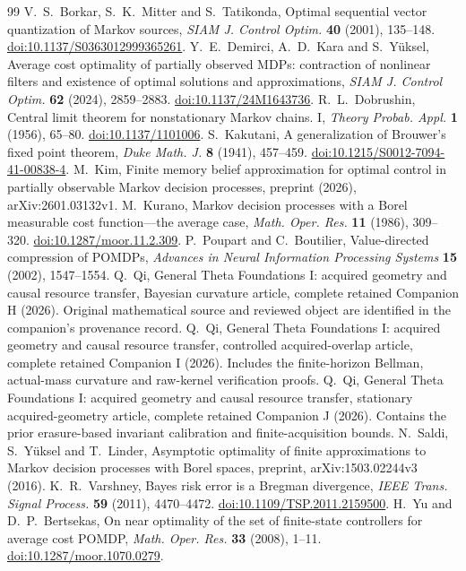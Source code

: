 \enlargethispage{2\baselineskip}
\begin{thebibliography}{99}
 V.~S.~Borkar, S.~K.~Mitter and S.~Tatikonda, Optimal sequential vector quantization of Markov sources, \emph{SIAM J. Control Optim.} \textbf{40} (2001), 135--148. \href{https://doi.org/10.1137/S0363012999365261}{doi:10.1137/S0363012999365261}.
 Y.~E.~Demirci, A.~D.~Kara and S.~Y\"uksel, Average cost optimality of partially observed MDPs: contraction of nonlinear filters and existence of optimal solutions and approximations, \emph{SIAM J. Control Optim.} \textbf{62} (2024), 2859--2883. \href{https://doi.org/10.1137/24M1643736}{doi:10.1137/24M1643736}.
 R.~L.~Dobrushin, Central limit theorem for nonstationary Markov chains. I, \emph{Theory Probab. Appl.} \textbf{1} (1956), 65--80. \href{https://doi.org/10.1137/1101006}{doi:10.1137/1101006}.
 S.~Kakutani, A generalization of Brouwer's fixed point theorem, \emph{Duke Math. J.} \textbf{8} (1941), 457--459. \href{https://doi.org/10.1215/S0012-7094-41-00838-4}{doi:10.1215/S0012-7094-41-00838-4}.
 M.~Kim, Finite memory belief approximation for optimal control in partially observable Markov decision processes, preprint (2026), arXiv:2601.03132v1.
 M.~Kurano, Markov decision processes with a Borel measurable cost function---the average case, \emph{Math. Oper. Res.} \textbf{11} (1986), 309--320. \href{https://doi.org/10.1287/moor.11.2.309}{doi:10.1287/moor.11.2.309}.
 P.~Poupart and C.~Boutilier, Value-directed compression of POMDPs, \emph{Advances in Neural Information Processing Systems} \textbf{15} (2002), 1547--1554.
 Q.~Qi, General Theta Foundations I: acquired geometry and causal resource transfer, Bayesian curvature article, complete retained Companion H (2026). Original mathematical source and reviewed object are identified in the companion's provenance record.
 Q.~Qi, General Theta Foundations I: acquired geometry and causal resource transfer, controlled acquired-overlap article, complete retained Companion I (2026). Includes the finite-horizon Bellman, actual-mass curvature and raw-kernel verification proofs.
 Q.~Qi, General Theta Foundations I: acquired geometry and causal resource transfer, stationary acquired-geometry article, complete retained Companion J (2026). Contains the prior erasure-based invariant calibration and finite-acquisition bounds.
 N.~Saldi, S.~Y\"uksel and T.~Linder, Asymptotic optimality of finite approximations to Markov decision processes with Borel spaces, preprint, arXiv:1503.02244v3 (2016).
 K.~R.~Varshney, Bayes risk error is a Bregman divergence, \emph{IEEE Trans. Signal Process.} \textbf{59} (2011), 4470--4472. \href{https://doi.org/10.1109/TSP.2011.2159500}{doi:10.1109/TSP.2011.2159500}.
 H.~Yu and D.~P.~Bertsekas, On near optimality of the set of finite-state controllers for average cost POMDP, \emph{Math. Oper. Res.} \textbf{33} (2008), 1--11. \href{https://doi.org/10.1287/moor.1070.0279}{doi:10.1287/moor.1070.0279}.
\end{thebibliography}
